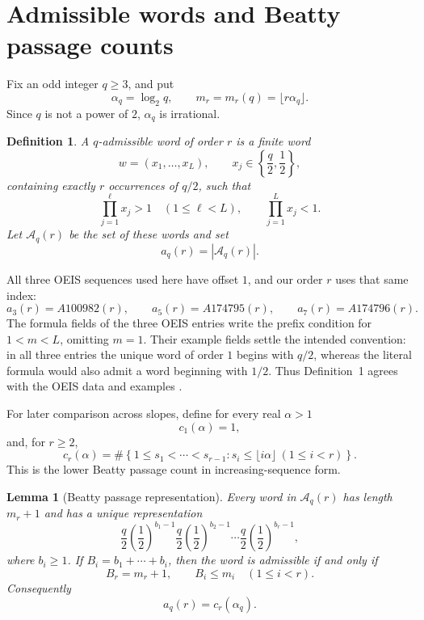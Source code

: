\documentclass[11pt]{article}
\newtheorem{lemma}[theorem]{Lemma}
\newtheorem{definition}[theorem]{Definition}
\newcommand{\Aq}{\mathcal A}
\begin{document}
\section{Admissible words and Beatty passage counts}
\label{sec:words}

Fix an odd integer \(q\geq3\), and put
\[
 \alpha_q=\log_2q,\qquad
 m_r=m_r(q)=\lfloor r\alpha_q\rfloor.
\]
Since \(q\) is not a power of \(2\), \(\alpha_q\) is irrational.

\begin{definition}
A \emph{\(q\)-admissible word of order \(r\)} is a finite word
\[
 w=(x_1,\ldots,x_L),
 \qquad
 x_j\in\left\{\frac q2,\frac12\right\},
\]
containing exactly \(r\) occurrences of \(q/2\), such that
\[
 \prod_{j=1}^{\ell}x_j>1
 \quad(1\leq\ell<L),
 \qquad
 \prod_{j=1}^{L}x_j<1.
\]
Let \(\Aq_q(r)\) be the set of these words and set
\[
 a_q(r)=|\Aq_q(r)|.
\]
\end{definition}

All three OEIS sequences used here have offset \(1\), and our order \(r\)
uses that same index:
\[
 a_3(r)=A100982(r),\qquad
 a_5(r)=A174795(r),\qquad
 a_7(r)=A174796(r).
\]
The formula fields of the three OEIS entries write the prefix condition for
\(1<m<L\), omitting \(m=1\). Their example fields settle the intended
convention: in all three entries the unique word of order \(1\) begins
with \(q/2\), whereas the literal formula would also admit a word beginning
with \(1/2\). Thus Definition~1 agrees with the OEIS data and examples
\cite{OEIS100982,OEIS174795,OEIS174796}.

For later comparison across slopes, define for every real \(\alpha>1\)
\[
 c_1(\alpha)=1,
\]
and, for \(r\geq2\),
\begin{equation}
 c_r(\alpha)=
 \#\left\{
 1\leq s_1<\cdots<s_{r-1}:
 s_i\leq\lfloor i\alpha\rfloor\ (1\leq i<r)
 \right\}.
 \tag{2.1}
\end{equation}
This is the lower Beatty passage count in increasing-sequence form.

\begin{lemma}[Beatty passage representation]
\label{lem:beatty-passage}
Every word in \(\Aq_q(r)\) has length \(m_r+1\) and has a unique
representation
\[
 \frac q2\left(\frac12\right)^{b_1-1}
 \frac q2\left(\frac12\right)^{b_2-1}
 \cdots
 \frac q2\left(\frac12\right)^{b_r-1},
\]
where \(b_i\geq1\). If \(B_i=b_1+\cdots+b_i\), then the word is
admissible if and only if
\[
 B_r=m_r+1,
 \qquad
 B_i\leq m_i
 \quad(1\leq i<r).
 \tag{2.2}
\]
Consequently
\[
 a_q(r)=c_r(\alpha_q).
 \tag{2.3}
\]
\end{lemma}
\end{document}
